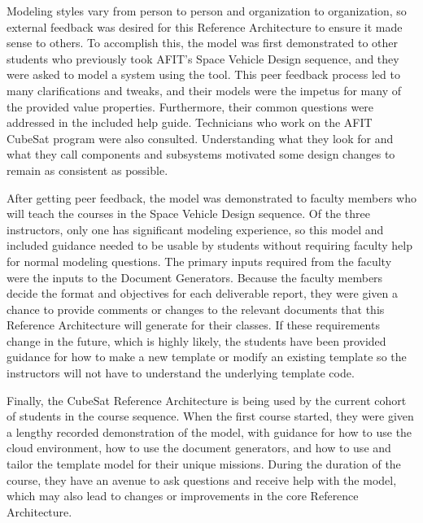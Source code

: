 Modeling styles vary from person to person and organization to organization, so external feedback was desired for this Reference Architecture to ensure it made sense to others. To accomplish this, the model was first demonstrated to other students who previously took AFIT's Space Vehicle Design sequence, and they were asked to model a system using the tool. This peer feedback process led to many clarifications and tweaks, and their models were the impetus for many of the provided value properties. Furthermore, their common questions were addressed in the included help guide. Technicians who work on the AFIT CubeSat program were also consulted. Understanding what they look for and what they call components and subsystems motivated some design changes to remain as consistent as possible.

After getting peer feedback, the model was demonstrated to faculty members who will teach the courses in the Space Vehicle Design sequence. Of the three instructors, only one has significant modeling experience, so this model and included guidance needed to be usable by students without requiring faculty help for normal modeling questions. The primary inputs required from the faculty were the inputs to the Document Generators. Because the faculty members decide the format and objectives for each deliverable report, they were given a chance to provide comments or changes to the relevant documents that this Reference Architecture will generate for their classes. If these requirements change in the future, which is highly likely, the students have been provided guidance for how to make a new template or modify an existing template so the instructors will not have to understand the underlying template code.

Finally, the CubeSat Reference Architecture is being used by the current cohort of students in the course sequence. When the first course started, they were given a lengthy recorded demonstration of the model, with guidance for how to use the cloud environment, how to use the document generators, and how to use and tailor the template model for their unique missions. During the duration of the course, they have an avenue to ask questions and receive help with the model, which may also lead to changes or improvements in the core Reference Architecture. 